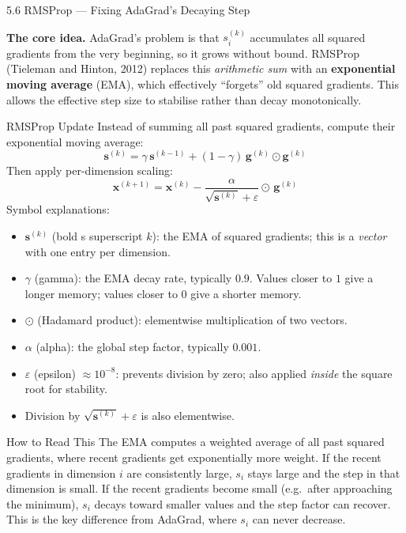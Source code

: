 \documentclass[aspectratio=169,10pt]{beamer}
\newcommand{\vx}{\mathbf{x}}
\newcommand{\vg}{\mathbf{g}}
\newcommand{\vs}{\mathbf{s}}
\begin{document}
\begin{frame}[allowframebreaks]{5.6 RMSProp --- Fixing AdaGrad's Decaying Step}

  \textbf{The core idea.}  AdaGrad's problem is that
  $s_i^{(k)}$ accumulates all squared gradients from the
  very beginning, so it grows without bound.  RMSProp
  (Tieleman and Hinton, 2012) replaces this
  \emph{arithmetic sum} with an
  \textbf{exponential moving average} (EMA), which
  effectively ``forgets'' old squared gradients.
  This allows the effective step size to stabilise rather
  than decay monotonically.

  \begin{block}{RMSProp Update}
    Instead of summing all past squared gradients,
    compute their exponential moving average:
    \[
      \vs^{(k)} = \gamma\,\vs^{(k-1)}
                + (1-\gamma)\,\vg^{(k)}\odot\vg^{(k)}
    \]
    Then apply per-dimension scaling:
    \[
      \vx^{(k+1)} = \vx^{(k)}
        - \frac{\alpha}{\sqrt{\vs^{(k)}} + \varepsilon}
          \odot\,\vg^{(k)}
    \]
    Symbol explanations:
    \begin{itemize}
      \item $\vs^{(k)}$ (bold s superscript $k$): the EMA
            of squared gradients; this is a \emph{vector}
            with one entry per dimension.
      \item $\gamma$ (gamma): the EMA decay rate, typically
            $0.9$.  Values closer to $1$ give a longer memory;
            values closer to $0$ give a shorter memory.
      \item $\odot$ (Hadamard product): elementwise
            multiplication of two vectors.
      \item $\alpha$ (alpha): the global step factor,
            typically $0.001$.
      \item $\varepsilon$ (epsilon) $\approx 10^{-8}$:
            prevents division by zero; also applied
            \emph{inside} the square root for stability.
      \item Division by $\sqrt{\vs^{(k)}}+\varepsilon$ is
            also elementwise.
    \end{itemize}
  \end{block}

  \framebreak

  \begin{alertblock}{How to Read This}
    The EMA computes a weighted average of all past squared
    gradients, where recent gradients get exponentially more
    weight.  If the recent gradients in dimension $i$ are
    consistently large, $s_i$ stays large and the step in
    that dimension is small.  If the recent gradients become
    small (e.g.\ after approaching the minimum), $s_i$ decays
    toward smaller values and the step factor can recover.
    This is the key difference from AdaGrad, where $s_i$ can
    never decrease.
  \end{alertblock}


\end{frame}
\end{document}
